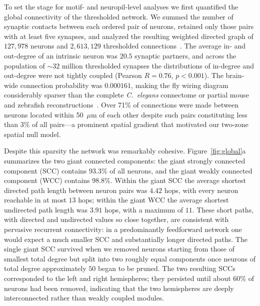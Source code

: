 \documentclass[11pt]{article}
\begin{document}
To set the stage for motif- and neuropil-level analyses we first quantified
the global connectivity of the thresholded network. We summed the number
of synaptic contacts between each ordered pair of neurons, retained only
those pairs with at least five synapses, and analyzed the resulting
weighted directed graph of $127{,}978$ neurons and $2{,}613{,}129$
thresholded connections~\cite{dorkenwald2024flywire}. The average in- and
out-degree of an intrinsic neuron was $20.5$ synaptic partners, and across
the population of $\sim 32$ million thresholded synapses the distributions
of in-degree and out-degree were not tightly coupled (Pearson $R = 0.76$,
$p < 0.001$). The brain-wide connection probability was $0.000161$, making
the fly wiring diagram considerably sparser than the complete
\textit{C.\ elegans} connectome or partial mouse and zebrafish
reconstructions~\cite{varshney2011structural,cook2019whole,song2005highly,svara2022automated}.
Over 71\% of connections were made between neurons located within 50~$\mu$m
of each other despite such pairs constituting less than 3\% of all
pairs---a prominent spatial gradient that motivated our two-zone spatial
null model.

Despite this sparsity the network was remarkably cohesive.
Figure~\ref{fig:global}a summarizes the two giant connected components:
the giant strongly connected component (SCC) contains 93.3\% of all
neurons, and the giant weakly connected component (WCC) contains 98.8\%.
Within the giant SCC the average shortest directed path length between
neuron pairs was $4.42$ hops, with every neuron reachable in at most $13$
hops; within the giant WCC the average shortest undirected path length was
$3.91$ hops, with a maximum of $11$. These short paths, with directed and
undirected values so close together, are consistent with pervasive
recurrent connectivity: in a predominantly feedforward network one would
expect a much smaller SCC and substantially longer directed paths. The
single giant SCC survived when we removed neurons starting from those of
smallest total degree but split into two roughly equal components once
neurons of total degree approximately $50$ began to be pruned. The two
resulting SCCs corresponded to the left and right hemispheres; they
persisted until about 60\% of neurons had been removed, indicating that
the two hemispheres are deeply interconnected rather than weakly coupled
modules.
\end{document}
